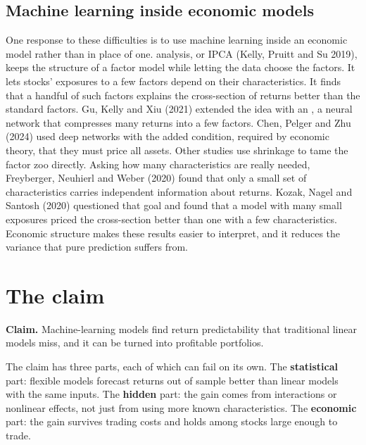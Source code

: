 \subsection{Machine learning inside economic models}

One response to these difficulties is to use machine learning inside an economic model rather than in place of one.  analysis, or IPCA (Kelly, Pruitt and Su 2019), keeps the structure of a factor model while letting the data choose the factors. It lets stocks' exposures to a few factors depend on their characteristics. It finds that a handful of such factors explains the cross-section of returns better than the standard factors. Gu, Kelly and Xiu (2021) extended the idea with an , a neural network that compresses many returns into a few factors. Chen, Pelger and Zhu (2024) used deep networks with the added condition, required by economic theory, that they must price all assets. Other studies use shrinkage to tame the factor zoo directly. Asking how many characteristics are really needed, Freyberger, Neuhierl and Weber (2020) found that only a small set of characteristics carries independent information about returns. Kozak, Nagel and Santosh (2020) questioned that goal and found that a model with many small exposures priced the cross-section better than one with a few characteristics. Economic structure makes these results easier to interpret, and it reduces the variance that pure prediction suffers from.

\section{The claim}
\label{sec:20-claim}

\begin{callout}
\textbf{Claim.} Machine-learning models find return predictability that traditional linear models miss, and it can be turned into profitable portfolios.
\end{callout}

The claim has three parts, each of which can fail on its own. The \textbf{statistical} part: flexible models forecast returns out of sample better than linear models with the same inputs. The \textbf{hidden} part: the gain comes from interactions or nonlinear effects, not just from using more known characteristics. The \textbf{economic} part: the gain survives trading costs and holds among stocks large enough to trade.

